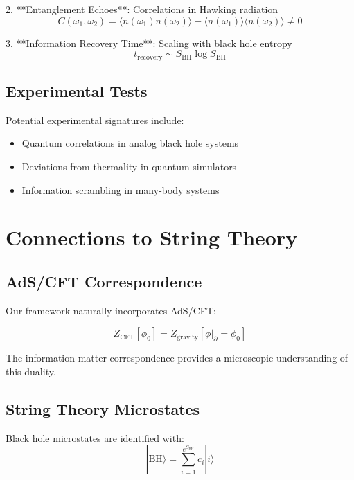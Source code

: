 \documentclass[12pt,a4paper]{article}
\begin{document}
2. **Entanglement Echoes**: Correlations in Hawking radiation
\begin{equation}
C(\omega_1, \omega_2) = \langle n(\omega_1) n(\omega_2) \rangle - \langle n(\omega_1) \rangle \langle n(\omega_2) \rangle \neq 0
\end{equation}

3. **Information Recovery Time**: Scaling with black hole entropy
\begin{equation}
t_{\text{recovery}} \sim S_{\text{BH}} \log S_{\text{BH}}
\end{equation}

\subsection{Experimental Tests}

Potential experimental signatures include:
\begin{itemize}
\item Quantum correlations in analog black hole systems
\item Deviations from thermality in quantum simulators
\item Information scrambling in many-body systems
\end{itemize}

\section{Connections to String Theory}

\subsection{AdS/CFT Correspondence}

Our framework naturally incorporates AdS/CFT:

\begin{equation}
Z_{\text{CFT}}[\phi_0] = Z_{\text{gravity}}[\phi|_{\partial} = \phi_0]
\end{equation}

The information-matter correspondence provides a microscopic understanding of this duality.

\subsection{String Theory Microstates}

Black hole microstates are identified with:
\begin{equation}
|\text{BH}\rangle = \sum_{i=1}^{e^{S_{\text{BH}}}} c_i |i\rangle
\end{equation}
\end{document}
